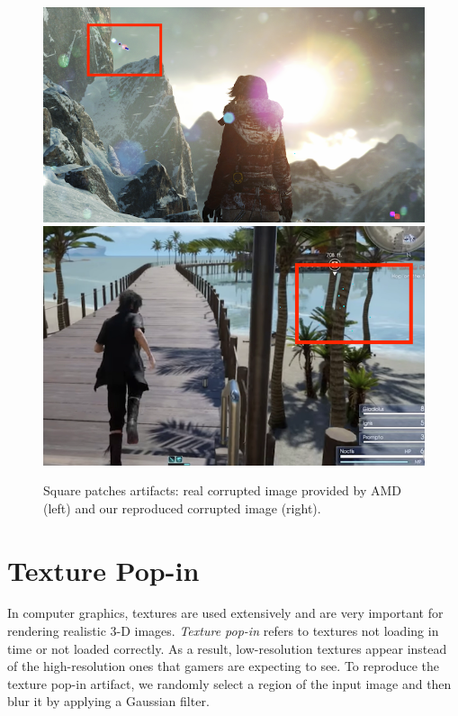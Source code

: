 \begin{figure}[!ht]
\includegraphics[scale=0.64]{images/sp1.png}
\includegraphics[scale=0.32]{images/sp2.png}
\vspace{5pt}
\caption[Square patches artifacts]{Square patches artifacts: real corrupted image provided by AMD (left) and our reproduced corrupted image (right).}
\label{fig:sp}
\end{figure}



\section*{Texture Pop-in}
In computer graphics, textures are used extensively and are very important for rendering realistic 3-D images. \textit{Texture pop-in} refers to textures not loading in time or not loaded correctly. As a result, low-resolution textures appear instead of the high-resolution ones that gamers are expecting to see. To reproduce the texture pop-in artifact, we randomly select a region of the input image and then blur it by applying a Gaussian filter.

